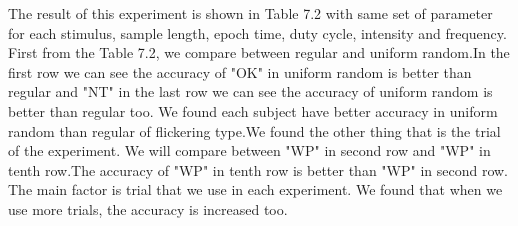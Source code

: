 The result of this experiment is shown in Table 7.2 with same set of parameter for each stimulus, sample length, epoch time, duty cycle, intensity and frequency. First from the Table 7.2, we compare between regular and uniform random.In the first row we can see the accuracy of "OK" in uniform random is better than regular and "NT" in the last row we can see the accuracy of uniform random is better than regular too. We found each subject have better accuracy in uniform random than regular of flickering type.We found the other thing that is the trial of the experiment. We will compare between "WP" in second row and "WP" in tenth row.The accuracy of "WP" in tenth row is better than "WP" in second row. The main factor is trial that we use in each experiment. We found that when we use more trials, the accuracy is increased too.


























